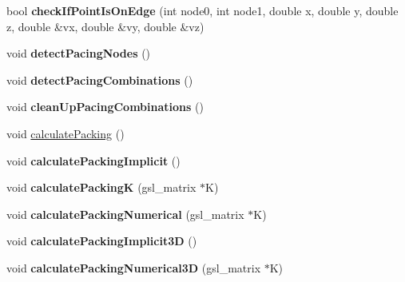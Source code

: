 \begin{DoxyCompactItemize}
\item 
\hypertarget{classSimulation_aded788a841393ce3c356b0d9c5c30611}{}bool {\bfseries check\+If\+Point\+Is\+On\+Edge} (int node0, int node1, double x, double y, double z, double \&vx, double \&vy, double \&vz)\label{classSimulation_aded788a841393ce3c356b0d9c5c30611}

\item 
\hypertarget{classSimulation_ab67230d22a5c07292574d10d5ee8fc13}{}void {\bfseries detect\+Pacing\+Nodes} ()\label{classSimulation_ab67230d22a5c07292574d10d5ee8fc13}

\item 
\hypertarget{classSimulation_aa414b669f99aab94e2445d42f5822e51}{}void {\bfseries detect\+Pacing\+Combinations} ()\label{classSimulation_aa414b669f99aab94e2445d42f5822e51}

\item 
\hypertarget{classSimulation_a7fd4e3930d7be7332fbfd13111c8dedb}{}void {\bfseries clean\+Up\+Pacing\+Combinations} ()\label{classSimulation_a7fd4e3930d7be7332fbfd13111c8dedb}

\item 
void \hyperlink{classSimulation_a51cb5448f660eeefc54a5d2a33ab561e}{calculate\+Packing} ()
\item 
\hypertarget{classSimulation_a7620062fdccce514fd74df51879499ee}{}void {\bfseries calculate\+Packing\+Implicit} ()\label{classSimulation_a7620062fdccce514fd74df51879499ee}

\item 
\hypertarget{classSimulation_a64a53ebf4200a7a0c4b58ccca52d008b}{}void {\bfseries calculate\+Packing\+K} (gsl\+\_\+matrix $\ast$K)\label{classSimulation_a64a53ebf4200a7a0c4b58ccca52d008b}

\item 
\hypertarget{classSimulation_a4e93c41adbaf7ab1d739c026043ab21f}{}void {\bfseries calculate\+Packing\+Numerical} (gsl\+\_\+matrix $\ast$K)\label{classSimulation_a4e93c41adbaf7ab1d739c026043ab21f}

\item 
\hypertarget{classSimulation_ab3ef0f5aa59deabb9e599f1bbdad5599}{}void {\bfseries calculate\+Packing\+Implicit3\+D} ()\label{classSimulation_ab3ef0f5aa59deabb9e599f1bbdad5599}

\item 
\hypertarget{classSimulation_ac3454c51c5fedcbe0538164ff6b2ae86}{}void {\bfseries calculate\+Packing\+Numerical3\+D} (gsl\+\_\+matrix $\ast$K)\label{classSimulation_ac3454c51c5fedcbe0538164ff6b2ae86}


\end{DoxyCompactItemize}
